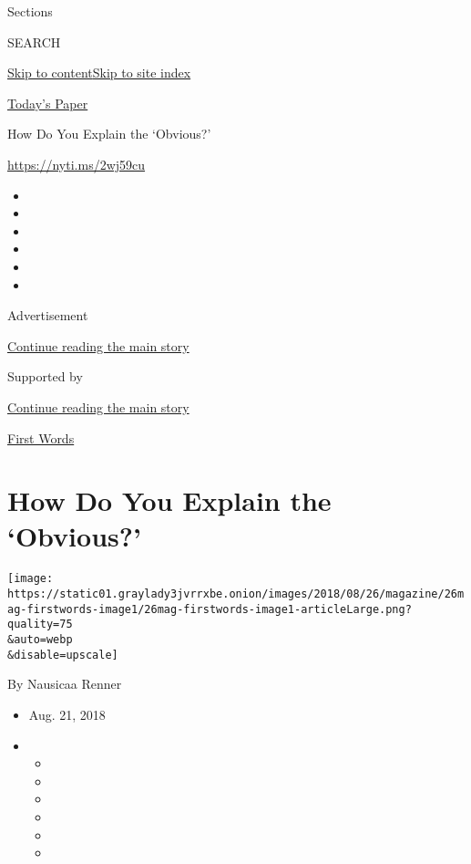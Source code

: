 Sections

SEARCH

\protect\hyperlink{site-content}{Skip to
content}\protect\hyperlink{site-index}{Skip to site index}

\href{https://myaccount.nytimes3xbfgragh.onion/auth/login?response_type=cookie\&client_id=vi}{}

\href{https://www.nytimes3xbfgragh.onion/section/todayspaper}{Today's
Paper}

How Do You Explain the `Obvious?'

\url{https://nyti.ms/2wj59cu}

\begin{itemize}
\item
\item
\item
\item
\item
\item
\end{itemize}

Advertisement

\protect\hyperlink{after-top}{Continue reading the main story}

Supported by

\protect\hyperlink{after-sponsor}{Continue reading the main story}

\href{/column/first-words}{First Words}

\hypertarget{how-do-you-explain-the-obvious}{%
\section{How Do You Explain the
`Obvious?'}\label{how-do-you-explain-the-obvious}}

\texttt{[image: https://static01.graylady3jvrrxbe.onion/images/2018/08/26/magazine/26mag-firstwords-image1/26mag-firstwords-image1-articleLarge.png?quality=75\\\&auto=webp\\\&disable=upscale]}

By Nausicaa Renner

\begin{itemize}
\item
  Aug. 21, 2018
\item
  \begin{itemize}
  \item
  \item
  \item
  \item
  \item
  \item
  \end{itemize}
\end{itemize}

